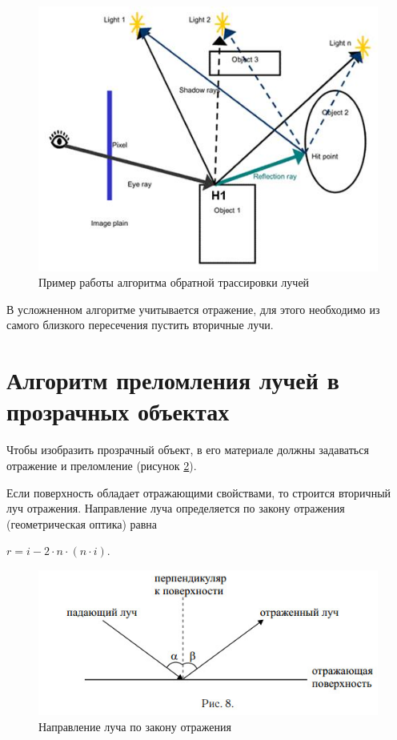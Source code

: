 \begin{figure}[ht!]
	\begin{center}
		\captionsetup{singlelinecheck = false, justification=centerfirst}
		\includegraphics[scale=0.8]{assets/tracric.jpeg}
		\caption{Пример работы алгоритма обратной трассировки лучей}
		\label{img:tracric}
	\end{center}
	
\end{figure}


В усложненном алгоритме учитывается отражение, для этого необходимо из самого близкого пересечения пустить вторичные лучи.

\section{Алгоритм преломления лучей в прозрачных объектах}

Чтобы изобразить прозрачный объект, в его материале должны задаваться отражение и преломление (рисунок \ref{img:lomka}). 

Если поверхность обладает отражающими свойствами, то строится вторичный луч отражения. Направление луча определяется по закону отражения (геометрическая оптика) равна 

$r = i - 2 \cdot n \cdot (n \cdot i)$.

\begin{figure}[ht!]
	\begin{center}
		\captionsetup{singlelinecheck = false, justification=centerfirst}
		\includegraphics[scale=1]{assets/lomka.jpeg}
		\caption{Направление луча по закону отражения}
		\label{img:lomka}
	\end{center}
	
\end{figure}

